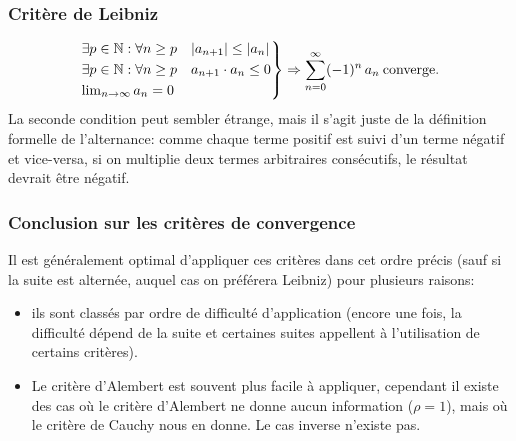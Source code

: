 \documentclass{article}
\begin{document}
\subsubsection{Critère de Leibniz}
\begin{equation*}
	\begin{rcases} %
		\exists p \in \mathbb{N} : \forall n \geq p \quad |a_{n+1}| \leq |a_n| \\
		\exists p \in \mathbb{N} : \forall n \geq p \quad a_{n+1} \cdot a_n \leq 0 \\
		\lim_{n \to \infty} a_n = 0
	\end{rcases}
	\Rightarrow \sum_{n=0}^\infty (-1)^n \, a_n \: \text{converge.}
\end{equation*}
La seconde condition peut sembler étrange, mais il s'agit juste de la définition formelle de l'alternance: comme chaque terme positif est suivi d'un terme négatif et vice-versa, si on multiplie deux termes arbitraires consécutifs, le résultat devrait être négatif.

\subsubsection{Conclusion sur les critères de convergence}
Il est généralement optimal d'appliquer ces critères dans cet ordre précis (sauf si la suite est alternée, auquel cas on préférera Leibniz) pour plusieurs raisons:
\begin{itemize}
	\item ils sont classés par ordre de difficulté d'application (encore une fois, la difficulté dépend de la suite et certaines suites appellent à l'utilisation de certains critères). %
	\item Le critère d'Alembert est souvent plus facile à appliquer, cependant il existe des cas où le critère d'Alembert ne donne aucun information (\(\rho = 1\)), mais où le critère de Cauchy nous en donne. Le cas inverse n'existe pas.
\end{itemize}
 
\end{document}

